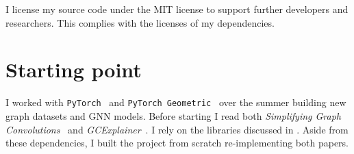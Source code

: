 I license my source code under the MIT license to support further developers and researchers.
This complies with the licenses of my dependencies.


\section{Starting point}

I worked with \texttt{PyTorch}~\cite{paszke2019pytorch} and \texttt{PyTorch Geometric}~\cite{Fey/Lenssen/2019} over the summer building new graph datasets and GNN models.
Before starting I read both \textit{Simplifying Graph Convolutions}~\cite{wu2019simplifying} and \textit{GCExplainer}~\cite{magister2021gcexplainer}.
I rely on the libraries discussed in .
Aside from these dependencies, I built the project from scratch re-implementing both papers.

